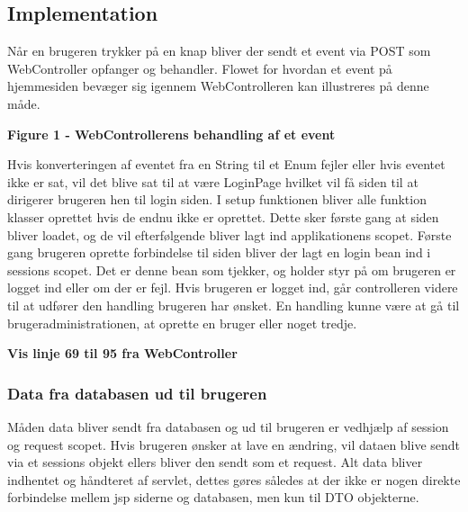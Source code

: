 \documentclass[a4paper]{article}
\begin{document}


\subsection{Implementation} %

Når en brugeren trykker på en knap bliver der sendt et event via POST som WebController opfanger og behandler. Flowet for hvordan et event på hjemmesiden bevæger sig igennem WebControlleren kan illustreres på denne måde. 
 
\begin{center}
  \textbf{ Figure 1 - WebControllerens behandling af et event }
\end{center}

Hvis konverteringen af  eventet fra en String til et Enum fejler eller hvis eventet ikke er sat, vil det blive sat til at være LoginPage hvilket vil få siden til at dirigerer brugeren hen til login siden. I setup funktionen bliver alle funktion klasser oprettet hvis de endnu ikke er oprettet. Dette sker første gang at siden bliver loadet, og de vil efterfølgende bliver lagt ind applikationens scopet. Første gang brugeren oprette forbindelse til siden bliver der lagt en login bean ind i sessions scopet. Det er denne bean som tjekker, og holder styr på om brugeren er logget ind eller om der er fejl. Hvis brugeren er logget ind, går controlleren videre til at udfører den handling brugeren har ønsket. En handling kunne være at gå til brugeradministrationen, at oprette en bruger eller noget tredje. 

\textbf{Vis linje 69 til 95 fra WebController}

\subsubsection{Data fra databasen ud til brugeren} %

Måden data bliver sendt fra databasen og ud til brugeren er vedhjælp af session og request scopet. Hvis brugeren ønsker at lave en ændring, vil dataen blive sendt via et sessions objekt ellers bliver den sendt som et request.  Alt data bliver indhentet og håndteret af servlet, dettes gøres således at der ikke er nogen direkte forbindelse mellem jsp siderne og databasen, men kun til DTO objekterne.   

\end{document}
